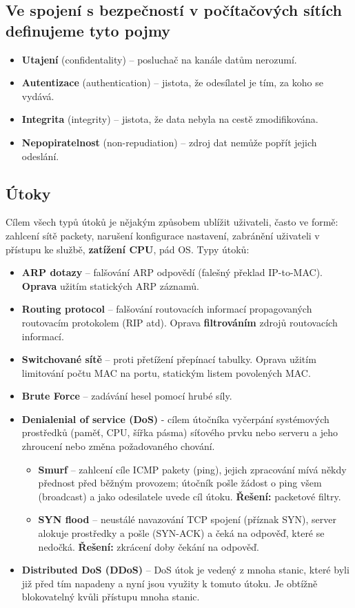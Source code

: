 \subsection{Ve spojení s bezpečností v počítačových sítích definujeme tyto pojmy}
\begin{itemize}
\item \textbf{Utajení} (confidentality) – posluchač na kanále datům nerozumí.
\item \textbf{Autentizace} (authentication) – jistota, že odesílatel je tím, za koho se vydává.
\item \textbf{Integrita} (integrity) – jistota, že data nebyla na cestě zmodifikována.
\item \textbf{Nepopiratelnost} (non-repudiation) – zdroj dat nemůže popřít jejich odeslání.
\end{itemize}

\subsection{Útoky}
Cílem všech typů útoků je nějakým způsobem ublížit uživateli, často ve formě: zahlcení sítě packety, narušení konfigurace nastavení, zabránění uživateli v přístupu ke službě, \textbf{zatížení CPU}, pád OS. Typy útoků:
\begin{itemize}
	\item \textbf{ARP dotazy} -- falšování ARP odpovědí (falešný překlad IP-to-MAC). \textbf{Oprava} užitím statických ARP záznamů.
	\item \textbf{Routing protocol} -- falšování routovacích informací propagovaných routovacím protokolem (RIP atd). Oprava 	\textbf{filtrováním} zdrojů routovacích informací.
	\item \textbf{Switchované sítě} -- proti přetížení přepínací tabulky. Oprava užitím limitování počtu MAC na portu, statickým 	listem povolených MAC.
	\item \textbf{Brute Force} -- zadávání hesel pomocí hrubé síly.
	\item \textbf{Denialenial of service (DoS)} - cílem útočníka vyčerpání systémových prostředků (paměť, CPU, šířka pásma) síťového prvku nebo serveru a jeho zhroucení nebo změna požadovaného chování.
\begin{itemize}
	\item \textbf{Smurf} -- zahlcení cíle ICMP pakety (ping), jejich zpracování mívá někdy přednost před běžným provozem; útočník pošle žádost o ping všem (broadcast) a jako odesilatele uvede cíl útoku. \textbf{Řešení:} packetové filtry.
	\item \textbf{SYN flood} -- neustálé navazování TCP spojení (příznak SYN), server alokuje prostředky a pošle (SYN-ACK) a čeká na odpověď, které se nedočká. \textbf{Řešení:} zkrácení doby čekání na odpověď.
\end{itemize}
	\item \textbf{Distributed DoS (DDoS)} -- DoS útok je vedený z mnoha stanic, které byli již před tím napadeny a nyní jsou využity k tomuto útoku. Je obtížně blokovatelný kvůli přístupu mnoha stanic.
\end{itemize}

